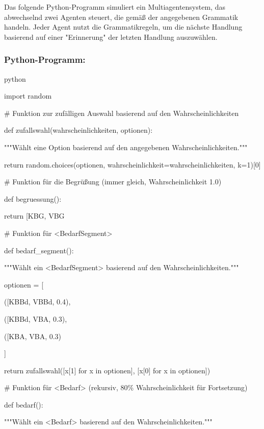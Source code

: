 \documentclass[
]{article}
\begin{document}
Das folgende Python-Programm simuliert ein Multiagentensystem, das
abwechselnd zwei Agenten steuert, die gemäß der angegebenen Grammatik
handeln. Jeder Agent nutzt die Grammatikregeln, um die nächste Handlung
basierend auf einer "Erinnerung" der letzten Handlung auszuwählen.

\subsubsection{\texorpdfstring{\textbf{Python-Programm:}}{Python-Programm:}}\label{python-programm}

python

import random

\# Funktion zur zufälligen Auswahl basierend auf den
Wahrscheinlichkeiten

def zufallswahl(wahrscheinlichkeiten, optionen):

"""Wählt eine Option basierend auf den angegebenen
Wahrscheinlichkeiten."""

return random.choices(optionen, wahrscheinlichkeit=wahrscheinlichkeiten,
k=1){[}0{]}

\# Funktion für die Begrüßung (immer gleich, Wahrscheinlichkeit 1.0)

def begruessung():

return {[}\textquotesingle KBG\textquotesingle,
\textquotesingle VBG\textquotesingle{]}

\# Funktion für \textless BedarfSegment\textgreater{}

def bedarf\_segment():

"""Wählt ein \textless BedarfSegment\textgreater{} basierend auf den
Wahrscheinlichkeiten."""

optionen = {[}

({[}\textquotesingle KBBd\textquotesingle,
\textquotesingle VBBd\textquotesingle{]}, 0.4),

({[}\textquotesingle KBBd\textquotesingle,
\textquotesingle VBA\textquotesingle{]}, 0.3),

({[}\textquotesingle KBA\textquotesingle,
\textquotesingle VBA\textquotesingle{]}, 0.3)

{]}

return zufallswahl({[}x{[}1{]} for x in optionen{]}, {[}x{[}0{]} for x
in optionen{]})

\# Funktion für \textless Bedarf\textgreater{} (rekursiv, 80\%
Wahrscheinlichkeit für Fortsetzung)

def bedarf():

"""Wählt ein \textless Bedarf\textgreater{} basierend auf den
Wahrscheinlichkeiten."""
\end{document}
